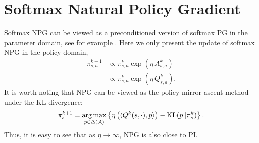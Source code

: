 \section{Softmax Natural Policy Gradient}
\label{sec:softmaxNpg}
Softmax NPG can be viewed as a preconditioned version of softmax PG in the parameter domain, see for example \cite{kakade2002npg,Agarwal_Kakade_Lee_Mahajan_2019}. Here we only present the update of softmax NPG in the policy domain,
\begin{align*}
\pi^{k+1}_{s,a}&\propto{\pi^k_{s,a}\exp(\eta\, A^k_{s,a})}\\
&\propto {\pi^k_{s,a}\exp(\eta\, Q^k_{s,a})}.%
\end{align*}
It is worth noting that NPG can be viewed as the policy mirror ascent method under the KL-divergence:
\begin{align*}
\pi_s^{k+1} = \operatorname*{arg\,max}_{p\in\Delta(\mathcal{A})}\left\{{\eta}\left(\langle Q^{k}(s,\cdot),p\rangle \right)-\mathrm{KL}(p\|\pi^k_s)\right\}.
\end{align*}
Thus, it is easy to see that as $\eta\rightarrow\infty$, NPG is also close to PI.


